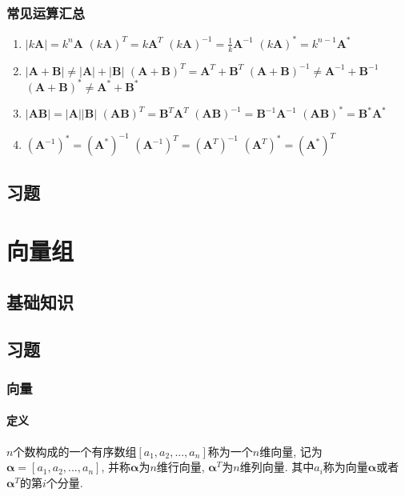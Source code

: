 \subsection{常见运算汇总}
\begin{enumerate}
	\item 
	\subitem $ |k\bm{A}|=k^{n}\bm{A} $
	\subitem $ (k\bm{A})^{T}=k\bm{A}^{T} $
	\subitem $ (k\bm{A})^{-1}=\frac{1}{k}\bm{A}^{-1} $
	\subitem $ (k\bm{A})^{*}=k^{n-1}\bm{A}^{*} $
	\item 
	\subitem $ |\bm{A}+\bm{B}|\neq |\bm{A}|+|\bm{B}| $
	\subitem $ (\bm{A}+\bm{B})^{T}=\bm{A}^{T}+\bm{B}^{T} $
	\subitem $ (\bm{A}+\bm{B})^{-1}\neq \bm{A}^{-1}+\bm{B}^{-1} $
	\subitem $ (\bm{A}+\bm{B})^{*}\neq \bm{A}^{*}+\bm{B}^{*} $
    \item 
    \subitem $ |\bm{A}\bm{B}|=|\bm{A}||\bm{B}| $
    \subitem $ (\bm{A}\bm{B})^{T}=\bm{B}^{T}\bm{A}^{T} $
    \subitem $ (\bm{A}\bm{B})^{-1}=\bm{B}^{-1}\bm{A}^{-1} $
    \subitem $ (\bm{A}\bm{B})^{*}=\bm{B}^{*}\bm{A}^{*} $
    \item 
    \subitem $ (\bm{A}^{-1})^{*}=(\bm{A}^{*})^{-1} $
    \subitem $ (\bm{A}^{-1})^{T}=(\bm{A}^{T})^{-1} $
    \subitem $ (\bm{A}^{T})^{*}=(\bm{A}^{*})^{T} $
\end{enumerate}
\section{习题}
\chapter{向量组}
\section{基础知识}
\section{习题}
\subsection{向量}
\subsubsection{定义}
$ n $个数构成的一个有序数组$ [a_{1},a_{2},...,a_{n}] $称为一个$ n $维向量, 记为$ \bm{\alpha} = [a_{1},a_{2},...,a_{n}] $, 并称$ \bm{\alpha} $为$ n $维行向量, $ \bm{\alpha}^{T} $为$ n $维列向量. 其中$ a_{i} $称为向量$ \bm{\alpha} $或者$ \bm{\alpha}^{T} $的第$ i $个分量.
